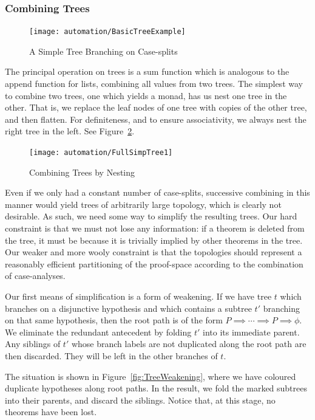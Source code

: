 \subsubsection{Combining Trees}\label{fig:CombiningTrees}
\begin{figure}
\centering\texttt{[image: automation/BasicTreeExample]}
\caption{A Simple Tree Branching on Case-splits}
\label{fig:BasicTreeExample}
\end{figure}

The principal operation on trees is a sum function which is analogous to the append function for lists, combining all values from two trees. The simplest way to combine two trees, one which yields a monad, has us nest one tree in the other. That is, we replace the leaf nodes of one tree with copies of the other tree, and then flatten. For definiteness, and to ensure associativity, we always nest the right tree in the left. See Figure~\ref{fig:TreeNesting}.

\begin{figure}
\centering\texttt{[image: automation/FullSimpTree1]}
\caption{Combining Trees by Nesting}
\label{fig:TreeNesting}
\end{figure}

Even if we only had a constant number of case-splits, successive combining in this manner would yield trees of arbitrarily large topology, which is clearly not desirable. As such, we need some way to simplify the resulting trees. Our hard constraint is that we must not lose any information: if a theorem is deleted from the tree, it must be because it is trivially implied by other theorems in the tree. Our weaker and more wooly constraint is that the topologies should represent a reasonably efficient partitioning of the proof-space according to the combination of case-analyses. 

Our first means of simplification is a form of weakening. If we have tree $t$ which branches on a disjunctive hypothesis and which contains a subtree $t'$ branching on that same hypothesis, then the root path is of the form $P \implies \cdots \implies P \implies \phi$. We eliminate the redundant antecedent by folding $t'$ into its immediate parent. Any siblings of $t'$ whose branch labels are not duplicated along the root path are then discarded. They will be left in the other branches of $t$.

The situation is shown in Figure~\ref{fig:TreeWeakening}, where we have coloured duplicate hypotheses along root paths. In the result, we fold the marked subtrees into their parents, and discard the siblings. Notice that, at this stage, no theorems have been lost.

